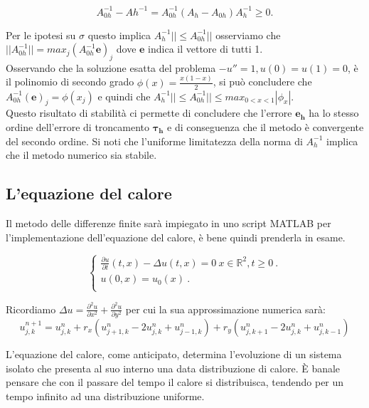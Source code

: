 $$A_{0h}^{-1}-A{h}^{-1}=A_{0h}^{-1}(A_h-A_{0h})A_h^{-1}\geq0.$$

Per le ipotesi su $\sigma$ questo implica $A_h^{-1}||\leq A_{0h}^{-1}||$
osserviamo che
$||A_{0h}^{-1}||=max_j(A_{0h}^{-1}\boldsymbol{e})_j$ dove $\boldsymbol{e}$ indica il vettore di tutti 1.\\
Osservando che la soluzione esatta del problema $-u'' = 1, u(0) = u(1) = 0$, è il polinomio di secondo grado $\phi(x) = \frac{x(1-x)}{2}$, si può concludere che $A_{0h}^{-1}(\boldsymbol{e})_j=\phi(x_j)$ e quindi che $A_h^{-1}||\leq A_{0h}^{-1}||\leq max_{0<x<1}|\phi_x|$.\\
Questo risultato di stabilità ci permette di concludere che l’errore $\boldsymbol{e_h}$ ha lo stesso ordine dell’errore di troncamento $\boldsymbol{\tau_h}$ e di conseguenza che il metodo è convergente del secondo ordine.
Si noti che l’uniforme limitatezza della norma di $A_h^{-1}$ implica che il metodo numerico sia stabile. 






\newpage

\subsection{L'equazione del calore}

\raggedright

Il metodo delle differenze finite sarà impiegato in uno script MATLAB per l'implementazione dell'equazione del calore, è bene quindi prenderla in esame.

\begin{equation} 
\begin{cases}

\frac{\partial u}{\partial t}(t,x)-\Delta u(t,x) = 0 \ x \in \mathbb R^2, t\ge 0 \ .\\ 

u(0,x) = u_0(x)\ . \\

\end{cases}
\end{equation}

Ricordiamo $\Delta u=\frac{\partial^2u}{\partial x^2}+\frac{\partial^2u}{\partial y^2}$ per cui la sua approssimazione numerica sarà:
$$
u_{j,k}^{n+1}=u_{j,k}^{n}+r_{x}(u_{j+1,k}^{n}-2u_{j,k}^{n}+u_{j-1,k}^{n})+r_{y}(u_{j,k+1}^{n}-2u_{j,k}^{n}+u_{j,k-1}^{n})
$$

L'equazione del calore, come anticipato, determina l'evoluzione di un sistema isolato che presenta al suo interno una data distribuzione di calore. \`E banale pensare che con il passare del tempo il calore si distribuisca, tendendo per un tempo infinito ad una distribuzione uniforme.

